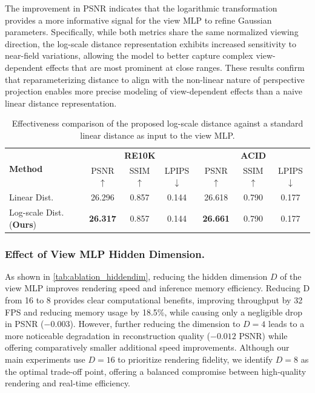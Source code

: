 The improvement in PSNR indicates that the logarithmic transformation provides a more informative signal for the view MLP to refine Gaussian parameters. Specifically, while both metrics share the same normalized viewing direction, the log-scale distance representation exhibits increased sensitivity to near-field variations, allowing the model to better capture complex view-dependent effects that are most prominent at close ranges. These results confirm that reparameterizing distance to align with the non-linear nature of perspective projection enables more precise modeling of view-dependent effects than a naive linear distance representation.

\begin{table}
    \centering
\caption{Effectiveness comparison of the proposed log-scale distance against a standard linear distance as input to the view MLP.}
\label{tab:ablation_targetpose}

\setlength{\tabcolsep}{5pt}
\begin{footnotesize}
    \begin{tabular}{l ccc ccc}
        \toprule
        \multirow{2}{*}{\textbf{Method}} & \multicolumn{3}{c}{\textbf{RE10K}} & \multicolumn{3}{c}{\textbf{ACID}} \\
            & PSNR$\uparrow$ & SSIM$\uparrow$ & LPIPS$\downarrow$ & PSNR$\uparrow$ & SSIM$\uparrow$ & LPIPS$\downarrow$ \\ \midrule
        Linear Dist. & 26.296 & 0.857 & 0.144 & 26.618 & 0.790 & 0.177 \\ 
        Log-scale Dist. (\textbf{Ours}) & \textbf{26.317} & 0.857 & 0.144 & \textbf{26.661} & 0.790 & 0.177 \\ \bottomrule
    \end{tabular}
\end{footnotesize}
\end{table}

\subsubsection{Effect of View MLP Hidden Dimension.}
As shown in \cref{tab:ablation_hiddendim}, reducing the hidden dimension $D$ of the view MLP improves rendering speed and inference memory efficiency. Reducing D from 16 to 8 provides clear computational benefits, improving throughput by 32 FPS and reducing memory usage by 18.5\%, while causing only a negligible drop in PSNR ($-0.003$). However, further reducing the dimension to $D=4$ leads to a more noticeable degradation in reconstruction quality ($-0.012$ PSNR) while offering comparatively smaller additional speed improvements. Although our main experiments use $D=16$ to prioritize rendering fidelity, we identify $D=8$ as the optimal trade-off point, offering a balanced compromise between high-quality rendering and real-time efficiency.

